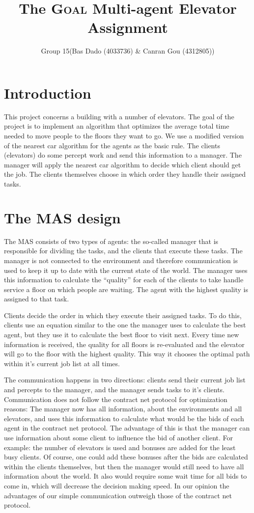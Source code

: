 \documentclass[a4paper,11pt,twocolumn]{article}
\title{The \textsc{Goal} Multi-agent Elevator Assignment}
\author{Group 15(Bas Dado (4033736) \& Canran Gou (4312805))}
\begin{document}
\maketitle

\section{Introduction}
This project concerns a building with a number of elevators. The goal of the project is to implement an algorithm that optimizes the average total time needed to move people to the floors they want to go. We use a modified version of the nearest car algorithm for the agents as the basic rule. The clients (elevators) do some percept work and send this information to a manager. The manager will apply the nearest car algorithm to decide which client should get the job.
The clients themselves choose in which order they handle their assigned tasks.

\section{The MAS design}
The MAS consists of two types of agents: the so-called manager that is responsible for dividing the tasks, and the clients that execute these tasks. The manager is not connected to the environment and therefore communication is used to keep it up to date with the current state of the world. The manager uses this information  to calculate the ``quality'' for each of the clients to take handle service a floor on which people are waiting. The agent with the highest quality is assigned to that task. 

Clients decide the order in which they execute their assigned tasks. To do this, clients use an equation similar to the one the manager uses to calculate the best agent, but they use it to calculate the best floor to visit next. Every time new information is received, the quality for all floors is re-evaluated and the elevator will go to the floor with the highest quality. This way it chooses the optimal path within it's current job list at all times.

The communication happens in two directions: clients send their current job list and percepts to the manager, and the manager sends tasks to it's clients. Communication does not follow the contract net protocol for optimization reasons: The manager now has all information, about the environments and all elevators, and uses this information to calculate what would be the bids of each agent in the contract net protocol. The advantage of this is that the manager can use information about some client to influence the bid of another client. For example: the number of elevators is used and bonuses are added for the least busy clients. Of course, one could add these bonuses after the bids are calculated within the clients themselves, but then the manager would still need to have all information about the world. It also would require some wait time for all bids to come in, which will decrease the decision making speed. In our opinion the advantages of our simple communication outweigh those of the contract net protocol.
\end{document}

